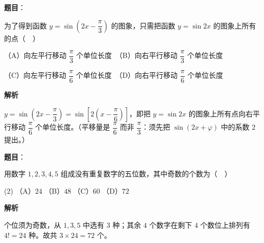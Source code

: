 \begin{answer}

\textbf{题目}：

为了得到函数 \(y=\sin\left(2x-\dfrac{\pi}{3}\right)\) 的图象，只需把函数 \(y=\sin 2x\) 的图象上所有的点（　）

（A）向左平行移动 \(\dfrac{\pi}{3}\) 个单位长度　（B）向右平行移动 \(\dfrac{\pi}{3}\) 个单位长度

（C）向左平行移动 \(\dfrac{\pi}{6}\) 个单位长度　（D）向右平行移动 \(\dfrac{\pi}{6}\) 个单位长度

\textbf{解析}

\(y=\sin\left(2x-\dfrac{\pi}{3}\right)=\sin\left[2\left(x-\dfrac{\pi}{6}\right)\right]\)，即把 \(y=\sin 2x\) 的图象上所有点向右平行移动 \(\dfrac{\pi}{6}\) 个单位长度。（平移量是 \(\dfrac{\pi}{6}\) 而非 \(\dfrac{\pi}{3}\)：须先把 \(\sin(2x+\varphi)\) 中的系数 \(2\) 提出。）


\end{answer}
\begin{answer}

\textbf{题目}：

用数字 \(1,2,3,4,5\) 组成没有重复数字的五位数，其中奇数的个数为（　）

\begin{gkopts}(2)
\task （A）\(24\)
\task （B）\(48\)
\task （C）\(60\)
\task （D）\(72\)
\end{gkopts}

\textbf{解析}

个位须为奇数，从 \(1,3,5\) 中选有 \(3\) 种；其余 \(4\) 个数字在剩下 \(4\) 个数位上排列有 \(4!=24\) 种。故共 \(3\times24=72\) 个。


\end{answer}
